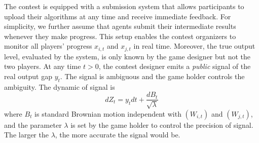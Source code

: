 \documentclass[mnsc]{informs3}
\begin{document}
The contest is equipped with a submission system that allows participants to upload their algorithms at any time and receive immediate feedback. 
For simplicity, we further assume that agents submit their intermediate results whenever they make progress. 
This setup enables the contest organizers to monitor all players’ progress $x_{i,t}$ and $x_{j,t}$ in real time. 
Moreover, the true output level, evaluated by the system, is only known by the game designer but not the two players. 
At any time $t>0$, the contest designer emits a \textit{public} signal of the real output gap $y_t$. 
The signal is ambiguous and the game holder controls the ambiguity. 
The dynamic of signal is  
\begin{equation}\label{signal}
	dZ_{t} = y_{t}dt + \frac{dB_{t}}{\sqrt{\lambda}} 
\end{equation}
where $B_{t}$ is standard Brownian motion independent with $(W_{i,t})$ and $(W_{j,t})$, and the parameter $\lambda$ is set by the game holder to control the precision of signal. 
The larger the $\lambda$, the more accurate the signal would be. 
\end{document}
